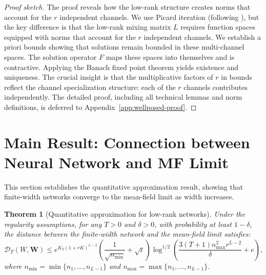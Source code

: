 \documentclass[11pt]{article}
\newcommand{\1}{\mathbbm{1}}
\newtheorem{theorem}{Theorem}
\begin{document}
\begin{proof}[Proof sketch]
The proof reveals how the low-rank structure creates norms that account for the $r$ independent channels. We use Picard iteration (following \cite{nguyen2023rigorousframeworkmeanfield}), but the key difference is that the low-rank mixing matrix $L$ requires function spaces equipped with norms that account for the $r$ independent channels. We establish a priori bounds showing that solutions remain bounded in these multi-channel spaces. The solution operator $F$ maps these spaces into themselves and is contractive. Applying the Banach fixed point theorem yields existence and uniqueness. The crucial insight is that the multiplicative factors of $r$ in bounds reflect the channel specialization structure: each of the $r$ channels contributes independently. The detailed proof, including all technical lemmas and norm definitions, is deferred to Appendix~\ref{app:wellposed-proof}.
\end{proof}

\section{Main Result: Connection between Neural Network and MF Limit}
\label{sec:Main-result}

This section establishes the quantitative approximation result, showing that finite-width networks converge to the mean-field limit as width increases.

\begin{theorem}[Quantitative approximation for low-rank networks]
\label{thm:quantitative-lowrank}
Under the regularity assumptions, for any $T>0$ and $\delta>0$, with probability at least $1-\delta$, the distance between the finite-width network and the mean-field limit satisfies:
\[
\mathscr{D}_T(W, \mathbf{W}) \le e^{K_T(1+rK)^{L-2}}\left(\frac{1}{\sqrt{n_{\min}}} + \sqrt{\epsilon}\right)\log^{1/2}\left(\frac{3(T+1)n_{\max}^2r^{L-2}}{\delta} + e\right),
\]
where $n_{\min} = \min\{n_1, \ldots, n_{L-1}\}$ and $n_{\max} = \max\{n_1, \ldots, n_{L-1}\}$.
\end{theorem}
\end{document}
